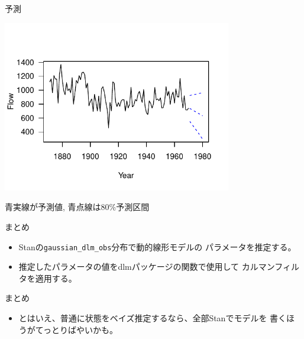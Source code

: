 \documentclass[dvipdfmx,12pt]{beamer}
\begin{document}
\begin{frame}{予測}
  \begin{center}
    \includegraphics[width=10cm]{dlm2_predict}
  \end{center}

  青実線が予測値, 青点線は80\%予測区間
\end{frame}

\begin{frame}{まとめ}
  \begin{itemize}
  \item \textsf{Stan}の\texttt{gaussian\_dlm\_obs}分布で動的線形モデルの
    パラメータを推定する。
  \item 推定したパラメータの値を\textsf{dlm}パッケージの関数で使用して
    カルマンフィルタを適用する。
  \end{itemize}
\end{frame}

\begin{frame}{まとめ}
  \begin{itemize}
  \item とはいえ、普通に状態をベイズ推定するなら、全部\textsf{Stanで}モデルを
    書くほうがてっとりばやいかも。

  \end{itemize}
\end{frame}
\end{document}

